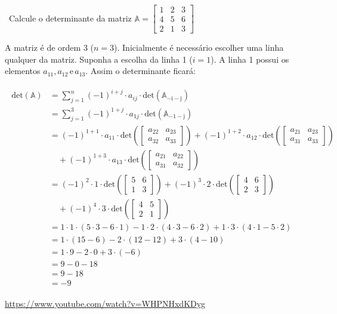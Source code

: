 \begin{example}
	\video \, Calcule o determinante da matriz $\mathbb{A}=\begin{bmatrix}1 & 2 & 3\\
	4 & 5 & 6\\
	2 & 1 & 3
	\end{bmatrix}$


	A matriz é de ordem 3 ($n=3$). Inicialmente é necessário escolher 	uma linha qualquer da matriz. Suponha a escolha da linha 1 ($i=1$).
	A linha 1 possui os elementos $a_{11}, a_{12}\, \mathrm{e}\,a_{13}$.
	Assim o determinante ficará:
	
	\begin{eqnarray*}
		\begin{split}
		\mathrm{det(\mathbb{A})} & = \sum_{j=1}^{n}(-1)^{i+j}\cdot a_{ij}\cdot\mathrm{det(\mathbb{A}_{-i-j})}\\
		& =  \sum_{j=1}^{3}(-1)^{1+j}\cdot a_{1j}\cdot\mathrm{det(\mathbb{A}_{-1-j})}\\
		& =  (-1)^{1+1}\cdot a_{11}\cdot\mathrm{det}(\begin{bmatrix}a_{22} & a_{23}\\
			a_{32} & a_{33}
		\end{bmatrix})+(-1)^{1+2}\cdot a_{12}\cdot\mathrm{det}(\begin{bmatrix}a_{21} & a_{23}\\
			a_{31} & a_{33}
		\end{bmatrix})\\
	& \quad+(-1)^{1+3}\cdot a_{13}\cdot\mathrm{det}(\begin{bmatrix}a_{21} & a_{22}\\
			a_{31} & a_{32}
		\end{bmatrix})\\
		& =  (-1)^{2}\cdot1\cdot\mathrm{det}(\begin{bmatrix}5 & 6\\
			1 & 3
		\end{bmatrix})+(-1)^{3}\cdot2\cdot\mathrm{det}(\begin{bmatrix}4 & 6\\
			2 & 3
		\end{bmatrix})\\
	& \quad+(-1)^{4}\cdot3\cdot\mathrm{det}(\begin{bmatrix}4 & 5\\
			2 & 1
		\end{bmatrix})\\
		& =  1\cdot1\cdot(5\cdot3-6\cdot1)-1\cdot2\cdot(4\cdot3-6\cdot2)+1\cdot3\cdot(4\cdot1-5\cdot2)\\
		& =  1\cdot(15-6)-2\cdot(12-12)+3\cdot(4-10)\\
		& =  1\cdot9-2\cdot0+3\cdot(-6)\\
		& =  9-0-18\\
		& =  9-18\\
		& =  -9
		\end{split}
	\end{eqnarray*}


\doutor \url{https://www.youtube.com/watch?v=WHPNHxdKDyg}
\end{example}

